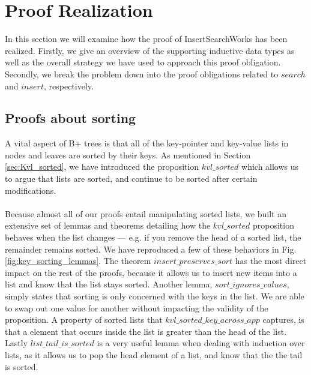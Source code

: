 \section{Proof Realization}
\label{sec:ProofRealization}
In this section we will examine how the proof of InsertSearchWorks has been realized. Firstly, we give an overview of the supporting inductive data types as well as the overall strategy we have used to approach this proof obligation. Secondly, we break the problem down into the proof obligations related to $search$ and $insert$, respectively. 

\subsection{Proofs about sorting}
A vital aspect of B+ trees is that all of the key-pointer and key-value lists in nodes and leaves are sorted by their keys. As mentioned in Section \ref{sec:Kvl_sorted}, we have introduced the proposition $kvl\_sorted$ which allows us to argue that lists are sorted, and continue to be sorted after certain modifications.

\paragraph{}
Because almost all of our proofs entail manipulating sorted lists, we built an extensive set of lemmas and theorems detailing how the $kvl\_sorted$ proposition behaves when the list changes --- e.g. if you remove the head of a sorted list, the remainder remains sorted. We have reproduced a few of these behaviors in Fig. \ref{fig:key_sorting_lemmas}. The theorem $insert\_preserves\_sort$ has the most direct impact on the rest of the proofs, because it allows us to insert new items into a list and know that the list stays sorted. Another lemma, $sort\_ignores\_values$, simply states that sorting is only concerned with the keys in the list. We are able to swap out one value for another without impacting the validity of the proposition. A property of sorted lists that $kvl\_sorted\_key\_across\_app$ captures, is that a element that occurs inside the list is greater than the head of the list. Lastly $list\_tail\_is\_sorted$ is a very useful lemma when dealing with induction over lists, as it allows us to pop the head element of a list, and know that the the tail is sorted.

